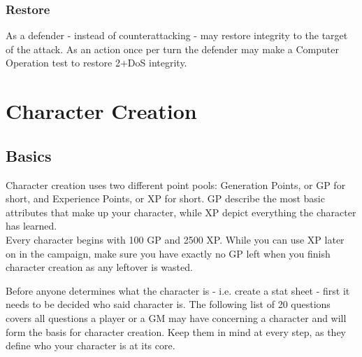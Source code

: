 \documentclass[12pt,a4paper,openany]{book}
\begin{document}
	\subsection*{Restore}
	As a defender - instead of counterattacking - may restore integrity to the target of the attack. As an action once per turn the defender may make a Computer Operation test to restore 2+DoS integrity.
	
	\chapter{Character Creation}
	\section{Basics}
	Character creation uses two different point pools: Generation Points, or GP for short, and Experience Points, or XP for short. GP describe the most basic attributes that make up your character, while XP depict everything the character has learned.\\
	Every character begins with 100 GP and 2500 XP. While you can use XP later on in the campaign, make sure you have exactly no GP left when you finish character creation as any leftover is wasted.
	
	Before anyone determines what the character is - i.e. create a stat sheet - first it needs to be decided who said character is. The following list of 20 questions covers all questions a player or a GM may have concerning a character and will form the basis for character creation. Keep them in mind at every step, as they define who your character is at its core.
	
\end{document}

